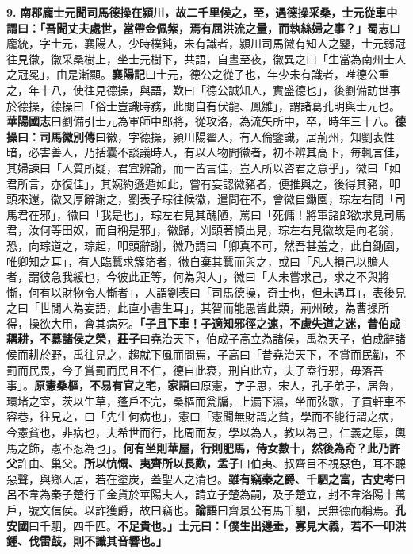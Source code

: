 \textbf{9.} \textbf{南郡龐士元聞司馬德操在潁川，故二千里候之，至，遇德操采桑，士元從車中謂曰：「吾聞丈夫處世，當帶金佩紫，焉有屈洪流之量，而執絲婦之事？」}{\footnotesize \textbf{蜀志}曰龐統，字士元，襄陽人，少時樸鈍，未有識者，潁川司馬徽有知人之鑒，士元弱冠往見徽，徽采桑樹上，坐士元樹下，共語，自晝至夜，徽異之曰「生當為南州士人之冠冕」，由是漸顯。\textbf{襄陽記}曰士元，德公之從子也，年少未有識者，唯德公重之，年十八，使往見德操，與語，歎曰「德公誠知人，實盛德也」，後劉備訪世事於德操，德操曰「俗士豈識時務，此閒自有伏龍、鳳雛」，謂諸葛孔明與士元也。\textbf{華陽國志}曰劉備引士元為軍師中郎將，從攻洛，為流矢所中，卒，時年三十八。}\textbf{德操曰：}{\footnotesize \textbf{司馬徽別傳}曰徽，字德操，潁川陽翟人，有人倫鑒識，居荊州，知劉表性暗，必害善人，乃括囊不談議時人，有以人物問徽者，初不辨其高下，毎輒言佳，其婦諫曰「人質所疑，君宜辨論，而一皆言佳，豈人所以咨君之意乎」，徽曰「如君所言，亦復佳」，其婉約遜遁如此，嘗有妄認徽豬者，便推與之，後得其豬，叩頭來還，徽又厚辭謝之，劉表子琮往候徽，遣問在不，會徽自鋤園，琮左右問「司馬君在邪」，徽曰「我是也」，琮左右見其醜陋，罵曰「死傭！將軍諸郎欲求見司馬君，汝何等田奴，而自稱是邪」，徽歸，刈頭著幘出見，琮左右見徽故是向老翁，恐，向琮道之，琮起，叩頭辭謝，徽乃謂曰「卿真不可，然吾甚羞之，此自鋤園，唯卿知之耳」，有人臨蠶求簇箔者，徽自棄其蠶而與之，或曰「凡人損己以贍人者，謂彼急我緩也，今彼此正等，何為與人」，徽曰「人未嘗求己，求之不與將慚，何有以財物令人慚者」，人謂劉表曰「司馬德操，奇士也，但未遇耳」，表後見之曰「世閒人為妄語，此直小書生耳」，其智而能愚皆此類，荊州破，為曹操所得，操欲大用，會其病死。}\textbf{「子且下車！子適知邪徑之速，不慮失道之迷，昔伯成耦耕，不慕諸侯之榮，}{\footnotesize \textbf{莊子}曰堯治天下，伯成子高立為諸侯，禹為天子，伯成辭諸侯而耕於野，禹往見之，趨就下風而問焉，子高曰「昔堯治天下，不賞而民勸，不罰而民畏，今子賞罰而民且不仁，德自此衰，刑自此立，夫子盍行邪，毋落吾事」。}\textbf{原憲桑樞，不易有官之宅，}{\footnotesize \textbf{家語}曰原憲，字子思，宋人，孔子弟子，居魯，環堵之室，茨以生草，蓬戶不完，桑樞而瓮牖，上漏下濕，坐而弦歌，子貢軒車不容巷，往見之，曰「先生何病也」，憲曰「憲聞無財謂之貧，學而不能行謂之病，今憲貧也，非病也，夫希世而行，比周而友，學以為人，教以為己，仁義之慝，輿馬之飾，憲不忍為也」。}\textbf{何有坐則華屋，行則肥馬，侍女數十，然後為奇？此乃許父}{\footnotesize 許由、巢父。}\textbf{所以忼慨、夷齊所以長歎，}{\footnotesize \textbf{孟子}曰伯夷、叔齊目不視惡色，耳不聽惡聲，與鄉人居，若在塗炭，蓋聖人之清也。}\textbf{雖有竊秦之爵、千駟之富，}{\footnotesize \textbf{古史考}曰呂不韋為秦子楚行千金貨於華陽夫人，請立子楚為嗣，及子楚立，封不韋洛陽十萬戶，號文信侯。以詐獲爵，故曰竊也。\textbf{論語}曰齊景公有馬千駟，民無德而稱焉。\textbf{孔安國}曰千駟，四千匹。}\textbf{不足貴也。」士元曰：「僕生出邊垂，寡見大義，若不一叩洪鍾、伐雷鼓，則不識其音響也。」}

